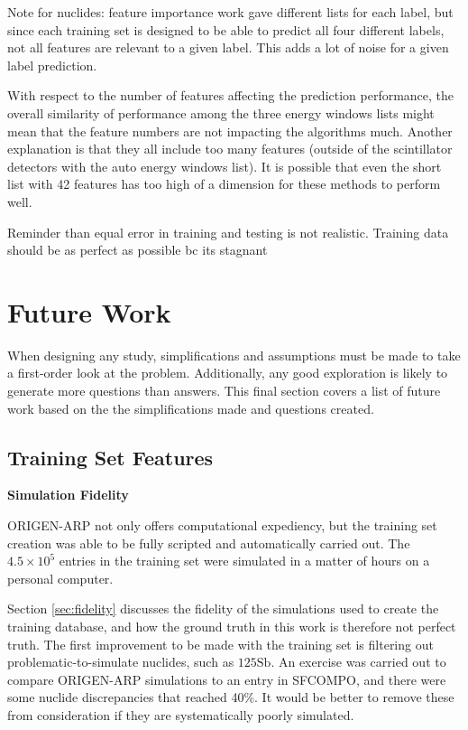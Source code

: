 Note for nuclides: feature importance work gave different lists for each label,
but since each training set is designed to be able to predict all four
different labels, not all features are relevant to a given label. This adds a
lot of noise for a given label prediction. 

With respect to the number of features affecting the prediction performance,
the overall similarity of performance among the three energy windows lists
might mean that the feature numbers are not impacting the algorithms much.
Another explanation is that they all include too many features (outside of the
scintillator detectors with the auto energy windows list).  It is possible that
even the short list with 42 features has too high of a dimension for these
methods to perform well. 

Reminder than equal error in training and testing is not realistic. Training
data should be as perfect as possible bc its stagnant

\section{Future Work}
\label{sec:future}

When designing any study, simplifications and assumptions must be made to take
a first-order look at the problem. Additionally, any good exploration is likely
to generate more questions than answers. This final section covers a list of
future work based on the the simplifications made and questions created.

\subsection{Training Set Features}

\noindent \textbf{Simulation Fidelity}

\gls{ORIGEN-ARP} not only offers computational expediency, but the training set
creation was able to be fully scripted and automatically carried out. The $4.5
\times 10^5$ entries in the training set were simulated in a matter of hours on
a personal computer.  

Section \ref{sec:fidelity} discusses the fidelity of the simulations used to
create the training database, and how the ground truth in this work is
therefore not perfect truth.  The first improvement to be made with the
training set is filtering out problematic-to-simulate nuclides, such as
${}{125}\text{Sb}$. An exercise was carried out to compare \gls{ORIGEN-ARP}
simulations to an entry in \gls{SFCOMPO}, and there were some nuclide
discrepancies that reached 40\%. It would be better to remove these from
consideration if they are systematically poorly simulated.

